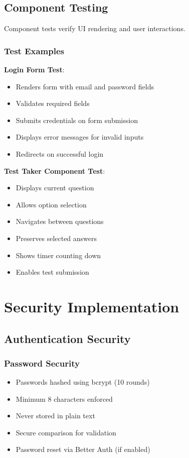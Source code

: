 \documentclass[12pt,a4paper]{report}
\begin{document}
\section{Component Testing}

Component tests verify UI rendering and user interactions.

\subsection{Test Examples}

\textbf{Login Form Test}:
\begin{itemize}
    \item Renders form with email and password fields
    \item Validates required fields
    \item Submits credentials on form submission
    \item Displays error messages for invalid inputs
    \item Redirects on successful login
\end{itemize}

\textbf{Test Taker Component Test}:
\begin{itemize}
    \item Displays current question
    \item Allows option selection
    \item Navigates between questions
    \item Preserves selected answers
    \item Shows timer counting down
    \item Enables test submission
\end{itemize}

\chapter{Security Implementation}

\section{Authentication Security}

\subsection{Password Security}

\begin{itemize}
    \item Passwords hashed using bcrypt (10 rounds)
    \item Minimum 8 characters enforced
    \item Never stored in plain text
    \item Secure comparison for validation
    \item Password reset via Better Auth (if enabled)
\end{itemize}
\end{document}
